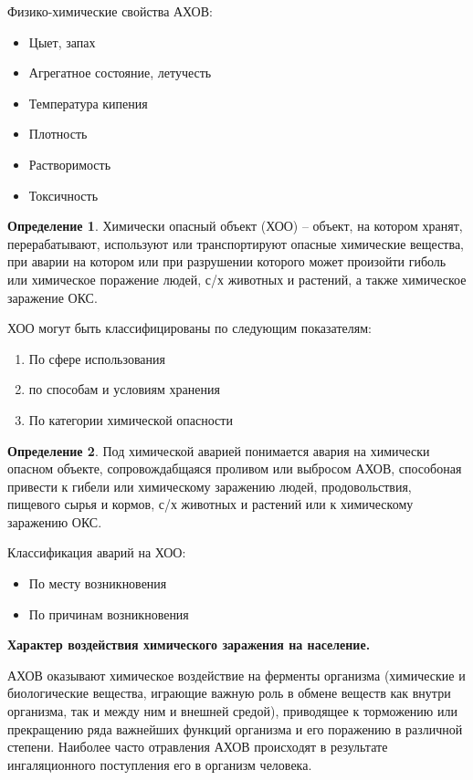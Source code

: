 \documentclass[a4paper, 12pt]{article}
\theoremstyle{definition}
\newtheorem*{definition}{Определение}
\begin{document}
        Физико-химические свойства АХОВ:
        \begin{itemize}
            \item Цыет, запах
            \item Агрегатное состояние, летучесть
            \item Температура кипения
            \item Плотность
            \item Растворимость
            \item Токсичность
        \end{itemize}
        \begin{definition}
            Химически опасный объект (ХОО) -- объект, на котором хранят, перерабатывают, используют или транспортируют опасные химические вещества, при аварии на котором или при разрушении которого может произойти гиболь или химическое поражение людей, с/х животных и растений, а также химическое заражение ОКС.
        \end{definition}
        ХОО могут быть классифицированы по следующим показателям:
        \begin{enumerate}
            \item По сфере использования
            \item по способам и условиям хранения
            \item По категории химической опасности
        \end{enumerate}
        \begin{definition}
            Под химической аварией понимается авария на химически\\ опасном объекте, сопровождабщаяся проливом или выбросом АХОВ, способоная привести к гибели или химическому заражению людей, продовольствия, пищевого сырья и кормов, с/х животных и растений или к химическому заражению ОКС.
        \end{definition}
        Классификация аварий на ХОО:
        \begin{itemize}
            \item По месту возникновения
            \item По причинам возникновения
        \end{itemize}
        \begin{center}
            \textbf{Характер воздействия химического заражения на население.} 
        \end{center}
        АХОВ оказывают химическое воздействие на ферменты организма (химические и биологические вещества, играющие важную роль в обмене веществ как внутри организма, так и между ним и внешней средой), приводящее к торможению или прекращению ряда важнейших функций организма и его поражению в различной степени. Наиболее часто отравления АХОВ происходят в результате ингаляционного поступления его в организм человека.
\end{document}
